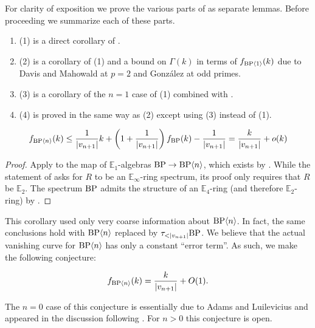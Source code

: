 For clarity of exposition we prove the various parts of  as separate lemmas. Before proceeding we summarize each of these parts.
\begin{enumerate}
\item {}(1) is a direct corollary of .
\item {}(2) is a corollary of (1) and a bound on $\Gamma(k)$ in terms of $f_{\mathrm{BP}\langle 1\rangle}(k)$ due to Davis and Mahowald \cite{DM3} at $p=2$ and Gonz\'alez \cite{GonzalezRegular} at odd primes.
\item {}(3) is a corollary of the $n=1$ case of (1) combined with .
\item {}(4) is proved in the same way as (2) except using (3) instead of (1). 
\end{enumerate}

\begin{cor}
  \label{cor:bpn-vl}
  $$ f_{\textup{BP}\langle n \rangle}(k) \leq \frac{1}{|v_{n+1}|}k + \left(1 + \frac{1}{|v_{n+1}|}\right)f_{\textup{BP}}(k) - \frac{1}{|v_{n+1}|} = \frac{k}{|v_{n+1}|} + o(k) $$
\end{cor}

\begin{proof}
    Apply  to the map of $\mathbb{E}_1$-algebras $\mathrm{BP} \to \mathrm{BP}\langle n \rangle$, which exists by \cite[Corollary 3.2]{Angeltveit}. While the statement of \cite[Corollary 3.2]{Angeltveit} asks for $R$ to be an $\mathbb{E}_\infty$-ring spectrum, its proof only requires that $R$ be $\mathbb{E}_2$. The spectrum $\mathrm{BP}$ admits the structure of an $\mathbb{E}_4$-ring (and therefore $\mathbb{E}_2$-ring) by \cite{BasterraMandell}.
\end{proof}

This corollary used only very coarse information about $\mathrm{BP}\langle n \rangle$.
In fact, the same conclusions hold with $\mathrm{BP}\langle n \rangle$ replaced by $\tau_{<|v_{n+1}|}\BP$.
We believe that the actual vanishing curve for $\mathrm{BP}\langle n \rangle$ has only a constant ``error term''. As such, we make the following conjecture:

\begin{cnj}
  $$ f_{\textup{BP}\langle n \rangle}(k) = \frac{k}{|v_{n+1}|} + O(1). $$
\end{cnj}

\begin{rmk}
    The $n=0$ case of this conjecture is essentially due to Adams and Luilevicius and appeared in the discussion following . For $n > 0$ this conjecture is open.
\end{rmk}

